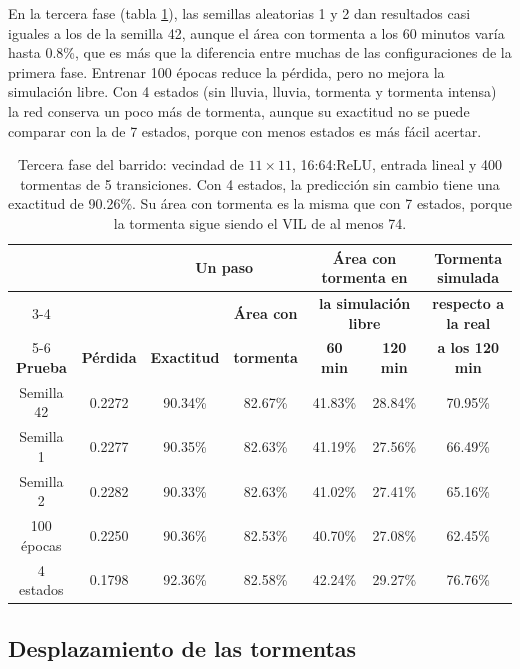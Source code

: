 En la tercera fase (tabla \ref{tab:sevir_barrido_estabilidad}), las semillas aleatorias 1 y 2 dan resultados casi iguales a los de la semilla 42, aunque el área con tormenta a los 60 minutos varía hasta 0.8\%, que es más que la diferencia entre muchas de las configuraciones de la primera fase. Entrenar 100 épocas reduce la pérdida, pero no mejora la simulación libre. Con 4 estados (sin lluvia, lluvia, tormenta y tormenta intensa) la red conserva un poco más de tormenta, aunque su exactitud no se puede comparar con la de 7 estados, porque con menos estados es más fácil acertar.

\begin{table}[htbp]
	\centering
	\footnotesize
	\setlength{\tabcolsep}{2.5pt}
	\begin{tabular}{@{}ccccccc@{}}
		\toprule
		& & \multicolumn{2}{c}{\textbf{Un paso}} & \multicolumn{2}{c}{\textbf{Área con tormenta en}} & \textbf{Tormenta simulada} \\
		\cmidrule(lr){3-4}
		& & & \textbf{Área con} & \multicolumn{2}{c}{\textbf{la simulación libre}} & \textbf{respecto a la real} \\
		\cmidrule(lr){5-6}
		\textbf{Prueba} & \textbf{Pérdida} & \textbf{Exactitud} & \textbf{tormenta} & \textbf{60 min} & \textbf{120 min} & \textbf{a los 120 min} \\ \midrule
		Semilla 42 & 0.2272 & 90.34\% & 82.67\% & 41.83\% & 28.84\% & 70.95\% \\
		Semilla 1 & 0.2277 & 90.35\% & 82.63\% & 41.19\% & 27.56\% & 66.49\% \\
		Semilla 2 & 0.2282 & 90.33\% & 82.63\% & 41.02\% & 27.41\% & 65.16\% \\
		100 épocas & 0.2250 & 90.36\% & 82.53\% & 40.70\% & 27.08\% & 62.45\% \\
		4 estados & 0.1798 & 92.36\% & 82.58\% & 42.24\% & 29.27\% & 76.76\% \\
		\bottomrule
	\end{tabular}
	\caption{Tercera fase del barrido: vecindad de $11 \times 11$, 16:64:ReLU, entrada lineal y 400 tormentas de 5 transiciones. Con 4 estados, la predicción sin cambio tiene una exactitud de 90.26\%. Su área con tormenta es la misma que con 7 estados, porque la tormenta sigue siendo el VIL de al menos 74.}
	\label{tab:sevir_barrido_estabilidad}
\end{table}

\subsection{Desplazamiento de las tormentas}

